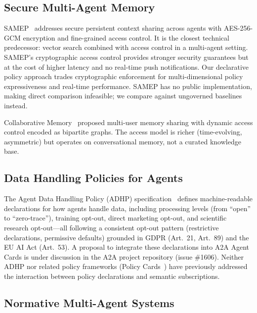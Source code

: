 \documentclass[11pt]{article}
\begin{document}
\subsection{Secure Multi-Agent Memory}

SAMEP~\cite{masoor2025} addresses secure persistent context sharing across agents with AES-256-GCM encryption and fine-grained access control. It is the closest technical predecessor: vector search combined with access control in a multi-agent setting. SAMEP's cryptographic access control provides stronger security guarantees but at the cost of higher latency and no real-time push notifications. Our declarative policy approach trades cryptographic enforcement for multi-dimensional policy expressiveness and real-time performance. SAMEP has no public implementation, making direct comparison infeasible; we compare against ungoverned baselines instead.

Collaborative Memory~\cite{rezazadeh2025} proposed multi-user memory sharing with dynamic access control encoded as bipartite graphs. The access model is richer (time-evolving, asymmetric) but operates on conversational memory, not a curated knowledge base.

\subsection{Data Handling Policies for Agents}

The Agent Data Handling Policy (ADHP) specification~\cite{johnson2025adhp} defines machine-readable declarations for how agents handle data, including processing levels (from ``open'' to ``zero-trace''), training opt-out, direct marketing opt-out, and scientific research opt-out---all following a consistent opt-out pattern (restrictive declarations, permissive defaults) grounded in GDPR (Art.~21, Art.~89) and the EU AI Act (Art.~53). A proposal to integrate these declarations into A2A Agent Cards is under discussion in the A2A project repository (issue \#1606). Neither ADHP nor related policy frameworks (Policy Cards~\cite{mavracic2025}) have previously addressed the interaction between policy declarations and semantic subscriptions.

\subsection{Normative Multi-Agent Systems}
\end{document}
